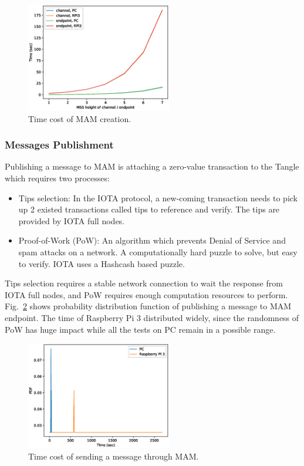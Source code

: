 \documentclass[conference]{IEEEtran}
\begin{document}
\begin{figure}[!t]
    \centering
    \includegraphics[width=2.5in]{mam_create}
    \caption{Time cost of MAM creation.}
    \label{fig:mam_create}
\end{figure}

\subsubsection{Messages Publishment}
Publishing a message to MAM is attaching a zero-value transaction to the Tangle which requires two processes:
\begin{itemize}
	\item	Tips selection: In the IOTA protocol, a new-coming transaction needs to pick up 2 existed transactions called tips to reference and verify. The tips are provided by IOTA full nodes.
	\item	Proof-of-Work (PoW): An algorithm which prevents Denial of Service and spam attacks on a network. A computationally hard puzzle to solve, but easy to verify. IOTA uses a Hashcash\cite{Hashcash} based puzzle.
\end{itemize}

Tips selection requires a stable network connection to wait the response from IOTA full nodes, and PoW requires enough computation resources to perform. Fig.~\ref{fig:mam_send} shows probability distribution function of publishing a message to MAM endpoint. The time of Raspberry Pi 3 distributed widely, since the randomness of PoW has huge impact while all the tests on PC remain in a possible range.

\begin{figure}[!t]
    \centering
    \includegraphics[width=2.5in]{mam_send}
    \caption{Time cost of sending a message through MAM.}
    \label{fig:mam_send}
\end{figure}
\end{document}
